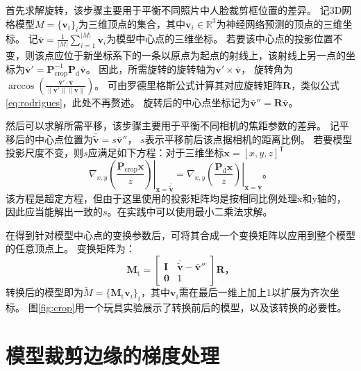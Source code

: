 首先求解旋转，该步骤主要用于平衡不同照片中人脸裁剪框位置的差异。
记3D网格模型$M=\{\mathbf{v}_i\}_i$为三维顶点的集合，其中$\mathbf{v}_i\in\mathbb{R}^3$为神经网络预测的顶点的三维坐标。
记$\bar{\mathbf{v}} = \frac{1}{|M|}\sum_{i=1}^{|M|}\mathbf{v}_i$为模型中心点的三维坐标。
若要该中心点的投影位置不变，则该点应位于新坐标系下的一条以原点为起点的射线上，该射线上另一点的坐标为$\bar{\mathbf{v}}' = \mathbf{P}_\mathrm{crop}^{-1}\mathbf{P}_\mathrm{d}\bar{\mathbf{v}}$。
因此，所需旋转的旋转轴为$\bar{\mathbf{v}}' \times \bar{\mathbf{v}}$，
旋转角为$\arccos\left(\frac{\bar{\mathbf{v}}'\cdot\bar{\mathbf{v}}}{\|\bar{\mathbf{v}}'\|\|\bar{\mathbf{v}}\|}\right)$。
可由罗德里格斯公式计算其对应旋转矩阵$\mathbf{R}$，类似公式\ref{eq:rodrigues}，此处不再赘述。
旋转后的中心点坐标记为$\bar{\mathbf{v}}'' = \mathbf{R}\bar{\mathbf{v}}$。

然后可以求解所需平移，该步骤主要用于平衡不同相机的焦距参数的差异。
记平移后的中心点位置为$\bar{\tilde{\mathbf{v}}} = s\bar{\mathbf{v}}''$，
$s$表示平移前后该点据相机的距离比例。
若要模型投影尺度不变，则$s$应满足如下方程：对于三维坐标$\mathbf{x}=[x,y,z]^\mathsf{T}$
\begin{equation}
    \left.\nabla_{x,y}\left(\frac{\mathbf{P}_\mathrm{crop}\mathbf{x}}{z}\right)\right|_{\mathbf{x}=\bar{\tilde{\mathbf{v}}}} =
    \left.\nabla_{x,y}\left(\frac{\mathbf{P}_\mathrm{d}\mathbf{x}}{z}\right)\right|_{\mathbf{x}=\bar{\mathbf{v}}}
    \text{。}
\end{equation}
该方程是超定方程，但由于这里使用的投影矩阵均是按相同比例处理x和y轴的，因此应当能解出一致的$s$。在实践中可以使用最小二乘法求解。

在得到针对模型中心点的变换参数后，可将其合成一个变换矩阵以应用到整个模型的任意顶点上。
变换矩阵为：
\begin{equation}
    \mathbf{M}_\mathrm{t} = \begin{bmatrix}
        \mathbf{I} & \bar{\tilde{\mathbf{v}}} - \bar{\mathbf{v}}'' \\
        \mathbf{0} & 1
    \end{bmatrix}\mathbf{R}
    \text{，}
\end{equation}
转换后的模型即为$\tilde{M}=\{\mathbf{M}_\mathrm{t}\mathbf{v}_i\}_i$，其中$\mathbf{v}_i$需在最后一维上加上1以扩展为齐次坐标。
图\ref{fig:crop}用一个玩具实验展示了转换前后的模型，以及该转换的必要性。

\section{模型裁剪边缘的梯度处理}
\label{sec:recon_sdf}


